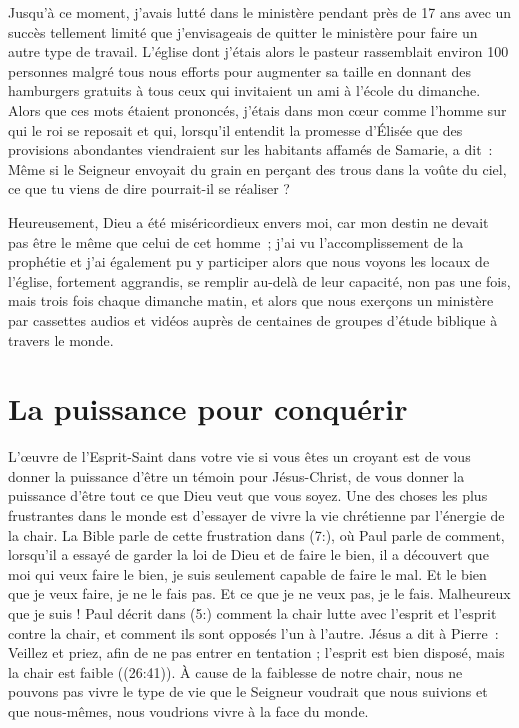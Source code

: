 Jusqu'à ce moment, j'avais lutté dans le ministère pendant près de 17 ans
 avec un succès tellement limité que j'envisageais de quitter le ministère
 pour faire un autre type de travail.
 L'église dont j'étais alors le pasteur rassemblait environ 100 personnes
 malgré tous nous efforts pour augmenter sa taille en donnant des hamburgers
 gratuits à tous ceux qui invitaient un ami à l'école du dimanche.
 Alors que ces mots étaient prononcés, j'étais dans mon cœur comme l'homme
 sur qui le roi se reposait et qui, lorsqu'il entendit la promesse d'Élisée
 que des provisions abondantes viendraient sur les habitants affamés
 de Samarie, a dit~:
 \og Même si le Seigneur envoyait du grain en perçant des trous dans
 la voûte du ciel, ce que tu viens de dire pourrait-il se réaliser ? \fg{}

Heureusement, Dieu a été miséricordieux envers moi,
 car mon destin ne devait pas être le même que celui de cet homme~;
 j'ai vu l'accomplissement de la prophétie et j'ai également pu y participer
 alors que nous voyons les locaux de l'église, fortement aggrandis,
 se remplir au-delà de leur capacité, non pas une fois, mais trois fois
 chaque dimanche matin, et alors que nous exerçons un ministère
 par cassettes audios et vidéos auprès de centaines de groupes
 d'étude biblique à travers le monde.

\section*{La puissance pour conquérir}

L'œuvre de l'Esprit-Saint dans votre vie si vous êtes un croyant
 est de vous donner la puissance d'être un témoin pour Jésus-Christ,
 de vous donner la puissance d'être tout ce que Dieu veut que vous soyez.
 Une des choses les plus frustrantes dans le monde est d'essayer
 de vivre la vie chrétienne par l'énergie de la chair.
 La Bible parle de cette frustration dans (7:),
 où Paul parle de comment, lorsqu'il a essayé de garder la loi de Dieu
 et de faire le bien, il a découvert que \og moi qui veux faire le bien,
 je suis seulement capable de faire le mal. Et le bien que je veux faire,
 je ne le fais pas. Et ce que je ne veux pas, je le fais.
 Malheureux que je suis ! \fg{}
 Paul décrit dans (5:) comment la chair lutte avec l'esprit
 et l'esprit contre la chair, et comment ils sont opposés l'un à l'autre.
 Jésus a dit à Pierre~:
 \og Veillez et priez, afin de ne pas entrer en tentation ;
 l'esprit est bien disposé, mais la chair est faible \fg{}
 ((26:41)).
 À cause de la faiblesse de notre chair, nous ne pouvons pas vivre
 le type de vie que le Seigneur voudrait que nous suivions
 et que nous-mêmes, nous voudrions vivre à la face du monde.

